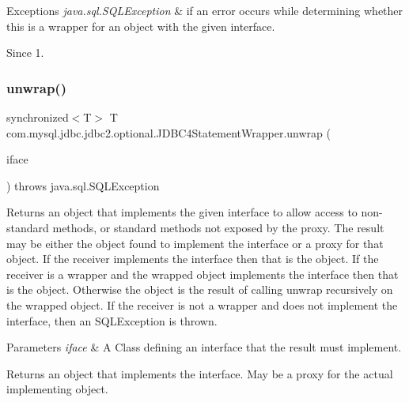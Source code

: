 \begin{DoxyExceptions}{Exceptions}
{\em java.\+sql.\+S\+Q\+L\+Exception} & if an error occurs while determining whether this is a wrapper for an object with the given interface. \\
\hline
\end{DoxyExceptions}
\begin{DoxySince}{Since}
1. 
\end{DoxySince}
\mbox{\label{classcom_1_1mysql_1_1jdbc_1_1jdbc2_1_1optional_1_1_j_d_b_c4_statement_wrapper_ad1f87d00ae53bc32a204939318a628e0}} 
\subsubsection{\texorpdfstring{unwrap()}{unwrap()}}
{\footnotesize\ttfamily synchronized$<$T$>$ T com.\+mysql.\+jdbc.\+jdbc2.\+optional.\+J\+D\+B\+C4\+Statement\+Wrapper.\+unwrap (\begin{DoxyParamCaption}\item[{java.\+lang.\+Class$<$ T $>$}]{iface }\end{DoxyParamCaption}) throws java.\+sql.\+S\+Q\+L\+Exception}

Returns an object that implements the given interface to allow access to non-\/standard methods, or standard methods not exposed by the proxy. The result may be either the object found to implement the interface or a proxy for that object. If the receiver implements the interface then that is the object. If the receiver is a wrapper and the wrapped object implements the interface then that is the object. Otherwise the object is the result of calling {\ttfamily unwrap} recursively on the wrapped object. If the receiver is not a wrapper and does not implement the interface, then an {\ttfamily S\+Q\+L\+Exception} is thrown.


\begin{DoxyParams}{Parameters}
{\em iface} & A Class defining an interface that the result must implement. \\
\hline
\end{DoxyParams}
\begin{DoxyReturn}{Returns}
an object that implements the interface. May be a proxy for the actual implementing object. 
\end{DoxyReturn}

